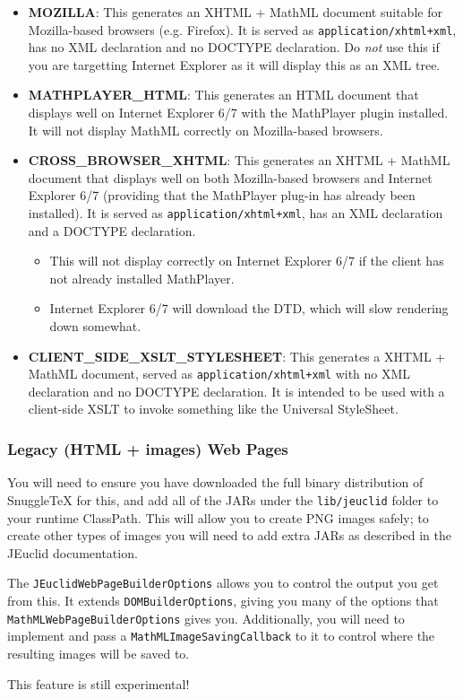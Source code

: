 \begin{itemize}
  \item \textbf{MOZILLA}: This generates an XHTML + MathML document suitable for
    Mozilla-based browsers (e.g. Firefox). It is served as \verb|application/xhtml+xml|,
    has no XML declaration and no DOCTYPE declaration. Do \emph{not} use this if you
    are targetting Internet Explorer as it will display this as an XML tree.

  \item \textbf{MATHPLAYER\_HTML}: This generates an HTML document that displays well
    on Internet Explorer 6/7 with the MathPlayer plugin installed. It will not display
    MathML correctly on Mozilla-based browsers.

  \item \textbf{CROSS\_BROWSER\_XHTML}: This generates an XHTML + MathML document that
    displays well on both Mozilla-based browsers and Internet Explorer 6/7 (providing that
    the MathPlayer plug-in has already been installed). It is served as \verb|application/xhtml+xml|,
    has an XML declaration and a DOCTYPE declaration.
    \begin{itemize}
      \item This will not display correctly on Internet Explorer 6/7 if the
        client has not already installed MathPlayer.
      \item Internet Explorer 6/7 will download the DTD, which will slow rendering down
        somewhat.
    \end{itemize}

  \item \textbf{CLIENT\_SIDE\_XSLT\_STYLESHEET}: This generates a XHTML + MathML document,
    served as \verb|application/xhtml+xml| with no XML declaration and no DOCTYPE declaration.
    It is intended to be used with a client-side XSLT to invoke something like the
    Universal StyleSheet.

\end{itemize}

\subsubsection*{Legacy (HTML + images) Web Pages}

You will need to ensure you have downloaded the full binary distribution of
SnuggleTeX for this, and add all of the JARs under the \verb|lib/jeuclid| folder
to your runtime ClassPath. This will allow you to create PNG images safely; to
create other types of images you will need to add extra JARs as described in
the JEuclid documentation.

The \verb|JEuclidWebPageBuilderOptions| allows you to control the output you
get from this. It extends \verb|DOMBuilderOptions|, giving you many of the
options that \verb|MathMLWebPageBuilderOptions| gives you. Additionally, you will
need to implement and pass a \verb|MathMLImageSavingCallback| to it to control where
the resulting images will be saved to.

This feature is still experimental!
